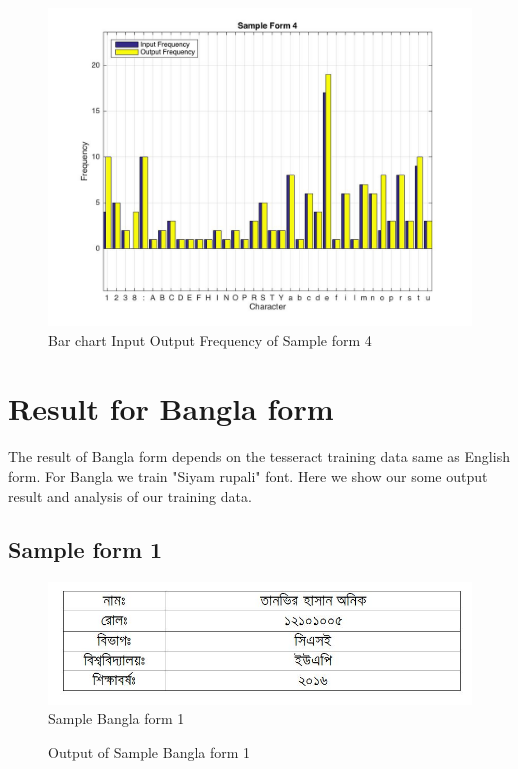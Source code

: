 \begin{figure}[H]
\centering
\includegraphics[width=1\textwidth]{Form4}
\caption {Bar chart Input Output Frequency of Sample form 4}
\label {fig:bar4}
\end{figure}


\section{Result for Bangla form}
The result of Bangla form depends on the tesseract training data same as English form. For Bangla we train "Siyam rupali" font. Here we show our some output result and analysis of our training data.
\subsection{Sample form 1}
\begin{figure}[H]
\centering
\includegraphics[width=1\textwidth]{formBen01}
\caption {Sample Bangla form 1}
\label {fig:FormBan1}
\end{figure}
\begin{figure}[H]
\centering
{}
\caption {Output of Sample Bangla form 1}
\label {fig:FormBanOut1}
\end{figure}
